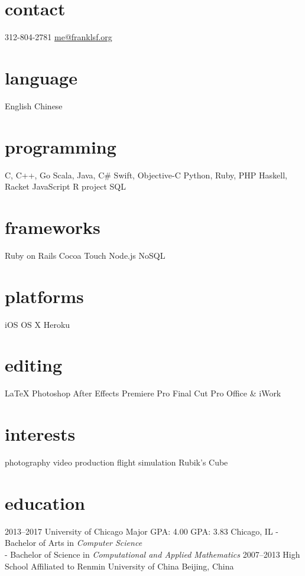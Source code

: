 \documentclass{friggeri-cv} %
\begin{document}


\begin{aside} %
\section{contact}
312-804-2781
\underline{me@franklsf.org}
\section{language}
English
Chinese
\section{programming}
C, C++, Go
Scala, Java, C\#
Swift, Objective-C
Python, Ruby, PHP
Haskell, Racket
JavaScript
R project
SQL
\section{frameworks}
Ruby on Rails
Cocoa Touch
Node.js
NoSQL
\section{platforms}
iOS
OS X
Heroku
\section{editing}
{\LaTeX}
Photoshop
After Effects
Premiere Pro
Final Cut Pro
Office \& iWork
\section{interests}
photography
video production
flight simulation
Rubik’s Cube
\end{aside}

\section{education}

\begin{entrylist}
\entry
{2013--2017}
{University of Chicago}
{Major GPA: 4.00\hspace{2em} GPA: 3.83\hspace{2em} Chicago, IL}
{- Bachelor of Arts in \emph{Computer Science} \\
 - Bachelor of Science in \emph{Computational and Applied Mathematics}}
\entry
{2007--2013}
{High School Affiliated to Renmin University of China}
{Beijing, China}
{}
\end{entrylist}
\end{document}
